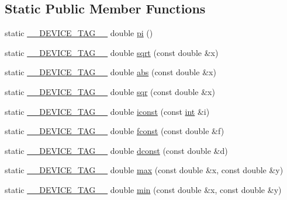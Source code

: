 \subsection*{Static Public Member Functions}
\begin{DoxyCompactItemize}
\item 
static \hyperlink{scalar__traits_8h_a2396f3e69fc9792ad01b8b14a1a425e3}{\-\_\-\-\_\-\-D\-E\-V\-I\-C\-E\-\_\-\-T\-A\-G\-\_\-\-\_\-} double \hyperlink{structscalar__traits_3_01double_01_4_ad9eb3c290d1f3675e64ccd207e840da9}{pi} ()
\item 
static \hyperlink{scalar__traits_8h_a2396f3e69fc9792ad01b8b14a1a425e3}{\-\_\-\-\_\-\-D\-E\-V\-I\-C\-E\-\_\-\-T\-A\-G\-\_\-\-\_\-} double \hyperlink{structscalar__traits_3_01double_01_4_a46e863105f23ed082e9a0763e38ebb38}{sqrt} (const double \&x)
\item 
static \hyperlink{scalar__traits_8h_a2396f3e69fc9792ad01b8b14a1a425e3}{\-\_\-\-\_\-\-D\-E\-V\-I\-C\-E\-\_\-\-T\-A\-G\-\_\-\-\_\-} double \hyperlink{structscalar__traits_3_01double_01_4_a1fdc913ea300bea3587613c00ea259fc}{abs} (const double \&x)
\item 
static \hyperlink{scalar__traits_8h_a2396f3e69fc9792ad01b8b14a1a425e3}{\-\_\-\-\_\-\-D\-E\-V\-I\-C\-E\-\_\-\-T\-A\-G\-\_\-\-\_\-} double \hyperlink{structscalar__traits_3_01double_01_4_a8506baec81d575fb9ad3027fa3035972}{sqr} (const double \&x)
\item 
static \hyperlink{scalar__traits_8h_a2396f3e69fc9792ad01b8b14a1a425e3}{\-\_\-\-\_\-\-D\-E\-V\-I\-C\-E\-\_\-\-T\-A\-G\-\_\-\-\_\-} double \hyperlink{structscalar__traits_3_01double_01_4_ac1ff6e7c0a049b31c7dc18224cdc31b9}{iconst} (const \hyperlink{classint}{int} \&i)
\item 
static \hyperlink{scalar__traits_8h_a2396f3e69fc9792ad01b8b14a1a425e3}{\-\_\-\-\_\-\-D\-E\-V\-I\-C\-E\-\_\-\-T\-A\-G\-\_\-\-\_\-} double \hyperlink{structscalar__traits_3_01double_01_4_ae95be56ada18337213a48a980c88fb0f}{fconst} (const double \&f)
\item 
static \hyperlink{scalar__traits_8h_a2396f3e69fc9792ad01b8b14a1a425e3}{\-\_\-\-\_\-\-D\-E\-V\-I\-C\-E\-\_\-\-T\-A\-G\-\_\-\-\_\-} double \hyperlink{structscalar__traits_3_01double_01_4_a434c742bc0e04dd87347921fef2bde44}{dconst} (const double \&d)
\item 
static \hyperlink{scalar__traits_8h_a2396f3e69fc9792ad01b8b14a1a425e3}{\-\_\-\-\_\-\-D\-E\-V\-I\-C\-E\-\_\-\-T\-A\-G\-\_\-\-\_\-} double \hyperlink{structscalar__traits_3_01double_01_4_a05ba341ef0bc1d505695aed684866280}{max} (const double \&x, const double \&y)
\item 
static \hyperlink{scalar__traits_8h_a2396f3e69fc9792ad01b8b14a1a425e3}{\-\_\-\-\_\-\-D\-E\-V\-I\-C\-E\-\_\-\-T\-A\-G\-\_\-\-\_\-} double \hyperlink{structscalar__traits_3_01double_01_4_ad16852e591794126351e32e3a229e0a4}{min} (const double \&x, const double \&y)
\end{DoxyCompactItemize}
